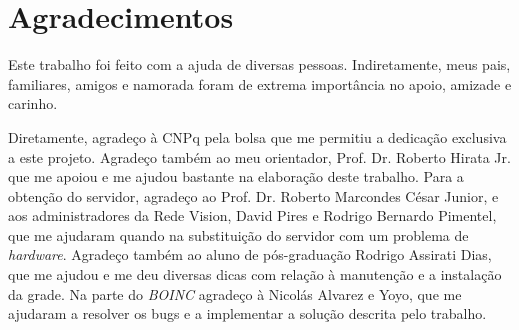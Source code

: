 \section{Agradecimentos}

Este trabalho foi feito com a ajuda de diversas pessoas. Indiretamente, meus pais, familiares, amigos e namorada foram de extrema importância 
no apoio, amizade e carinho. 

Diretamente, agradeço à CNPq pela bolsa que me permitiu a dedicação exclusiva a este projeto. Agradeço também ao meu orientador, 
Prof. Dr. Roberto Hirata Jr. que me apoiou e me ajudou bastante na elaboração deste trabalho. Para a obtenção do servidor,
agradeço ao Prof. Dr. Roberto Marcondes César Junior, e aos administradores da Rede Vision, David Pires e Rodrigo Bernardo Pimentel, 
que me ajudaram quando na substituição do servidor com um problema de \emph{hardware}. Agradeço também ao aluno de pós-graduação
Rodrigo Assirati Dias, que me ajudou e me deu diversas dicas com relação à manutenção e a instalação da grade. Na parte do \emph{BOINC}
agradeço à Nicolás Alvarez e Yoyo, que me ajudaram a resolver os bugs e a implementar a solução descrita pelo trabalho.



